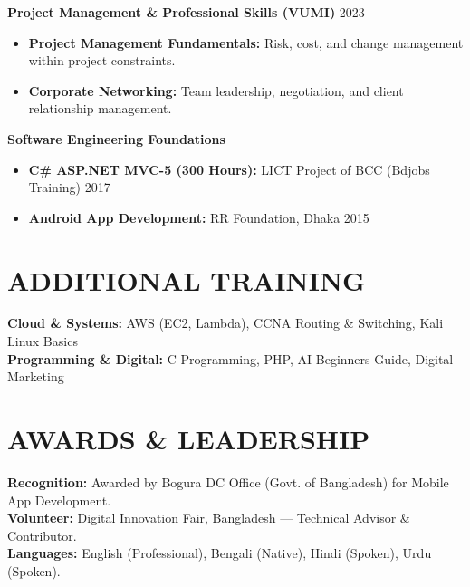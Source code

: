 \documentclass[10pt,a4paper]{article}
\begin{document}
\vspace{2pt}

\textbf{Project Management \& Professional Skills (VUMI)} \hfill 2023
\begin{itemize}
    \item \textbf{Project Management Fundamentals:} Risk, cost, and change management within project constraints.
    \item \textbf{Corporate Networking:} Team leadership, negotiation, and client relationship management.
\end{itemize}

\vspace{2pt}

\textbf{Software Engineering Foundations}
\begin{itemize}
    \item \textbf{C\# ASP.NET MVC-5 (300 Hours):} LICT Project of BCC (Bdjobs Training) \hfill 2017
    \item \textbf{Android App Development:} RR Foundation, Dhaka \hfill 2015
\end{itemize}

\section*{ADDITIONAL TRAINING}
\textbf{Cloud \& Systems:} AWS (EC2, Lambda), CCNA Routing \& Switching, Kali Linux Basics \\
\textbf{Programming \& Digital:} C Programming, PHP, AI Beginners Guide, Digital Marketing

\section*{AWARDS \& LEADERSHIP}
\textbf{Recognition:} Awarded by Bogura DC Office (Govt. of Bangladesh) for Mobile App Development. \\
\textbf{Volunteer:} Digital Innovation Fair, Bangladesh — Technical Advisor \& Contributor. \\
\textbf{Languages:} English (Professional), Bengali (Native), Hindi (Spoken), Urdu (Spoken).
\end{document}
